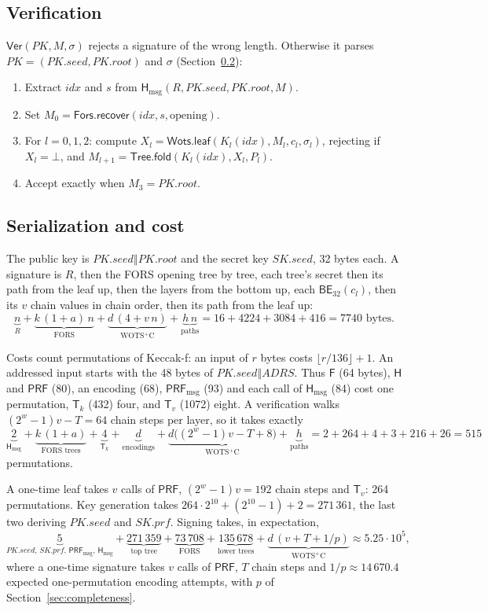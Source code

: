 \documentclass[11pt]{article}
\newcommand{\PRF}{\mathsf{PRF}}
\newcommand{\PRFmsg}{\mathsf{PRF}_{\mathrm{msg}}}
\newcommand{\Hmsg}{\mathsf{H}_{\mathrm{msg}}}
\newcommand{\Ver}{\mathsf{Ver}}
\newcommand{\BE}{\mathsf{BE}}
\newcommand{\concat}{\mathbin\Vert}
\newcommand{\PK}{\mathit{PK}}
\newcommand{\pkseed}{\mathit{PK.seed}}
\newcommand{\pkroot}{\mathit{PK.root}}
\newcommand{\skseed}{\mathit{SK.seed}}
\newcommand{\skprf}{\mathit{SK.prf}}
\newcommand{\addr}{\mathit{ADRS}}
\newcommand{\idx}{\mathit{idx}}
\newcommand{\WotsLeaf}{\mathsf{Wots.leaf}}
\newcommand{\TreeFold}{\mathsf{Tree.fold}}
\newcommand{\ForsRec}{\mathsf{Fors.recover}}
\begin{document}
\subsection{Verification}

$\Ver(\PK,M,\sigma)$ rejects a signature of the wrong length. Otherwise it parses $\PK=(\pkseed,\pkroot)$ and $\sigma$ (Section~\ref{sec:costs}):
\begin{enumerate}
\item Extract $\idx$ and $s$ from $\Hmsg(R,\pkseed,\pkroot,M)$.
\item Set $M_0=\ForsRec(\idx,s,\text{opening})$.
\item For $l=0,1,2$: compute $X_l=\WotsLeaf(K_l(\idx),M_l,c_l,\sigma_l)$, rejecting if $X_l=\bot$, and $M_{l+1}=\TreeFold(K_l(\idx),X_l,P_l)$.
\item Accept exactly when $M_3=\pkroot$.
\end{enumerate}

\subsection{Serialization and cost}
\label{sec:costs}

The public key is $\pkseed\concat\pkroot$ and the secret key $\skseed$, 32 bytes each. A signature is $R$, then the FORS opening tree by tree, each tree's secret then its path from the leaf up, then the layers from the bottom up, each $\BE_{32}(c_l)$, then its $v$ chain values in chain order, then its path from the leaf up:
\[
  \underbrace{n}_{R}
  +\underbrace{k\,(1+a)\,n}_{\text{FORS}}
  +\underbrace{d\,(4+v\,n)}_{\text{WOTS$^+$C}}
  +\underbrace{h\,n}_{\text{paths}}
  =16+4224+3084+416=7740\text{ bytes}.
\]

Costs count permutations of Keccak-f: an input of $r$ bytes costs $\lfloor r/136\rfloor+1$. An addressed input starts with the 48 bytes of $\pkseed\concat\addr$. Thus $\mathsf F$ (64 bytes), $\mathsf H$ and $\PRF$ (80), an encoding (68), $\PRFmsg$ (93) and each call of $\Hmsg$ (84) cost one permutation, $\mathsf T_k$ (432) four, and $\mathsf T_v$ (1072) eight. A verification walks $(2^w-1)v-T=64$ chain steps per layer, so it takes exactly
\[
  \underbrace{2}_{\Hmsg}
  +\underbrace{k\,(1+a)}_{\text{FORS trees}}
  +\underbrace{4}_{\mathsf T_k}
  +\underbrace{d}_{\text{encodings}}
  +\underbrace{d\bigl((2^w-1)v-T+8\bigr)}_{\text{WOTS$^+$C}}
  +\underbrace{h}_{\text{paths}}
  =2+264+4+3+216+26=515
\]
permutations.

A one-time leaf takes $v$ calls of $\PRF$, $(2^w-1)v=192$ chain steps and $\mathsf T_v$: 264 permutations. Key generation takes $264\cdot2^{10}+(2^{10}-1)+2=271\,361$, the last two deriving $\pkseed$ and $\skprf$. Signing takes, in expectation,
\[
  \underbrace{5}_{\pkseed,\,\skprf,\,\PRFmsg,\,\Hmsg}
  +\underbrace{271\,359}_{\text{top tree}}
  +\underbrace{73\,708}_{\text{FORS}}
  +\underbrace{135\,678}_{\text{lower trees}}
  +\underbrace{d\,(v+T+1/p)}_{\text{WOTS$^+$C}}
  \approx5.25\cdot10^5,
\]
where a one-time signature takes $v$ calls of $\PRF$, $T$ chain steps and $1/p\approx14\,670.4$ expected one-permutation encoding attempts, with $p$ of Section~\ref{sec:completeness}.
\end{document}
